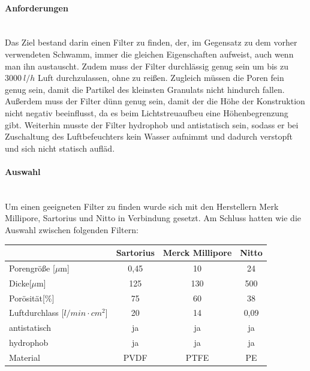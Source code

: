 \paragraph{Anforderungen}
\hfill \\
Das Ziel bestand darin einen Filter zu finden, der, im Gegensatz zu dem vorher verwendeten Schwamm, immer die gleichen Eigenschaften aufweist, auch wenn man ihn austauscht. Zudem muss der Filter durchlässig genug sein um bis zu $\SI{3000}{l/h}$ Luft durchzulassen, ohne zu reißen. Zugleich müssen die Poren fein genug sein, damit die Partikel des kleinsten Granulats nicht hindurch fallen. Außerdem muss der Filter dünn genug sein, damit der die Höhe der Konstruktion nicht negativ beeinflusst, da es beim Lichtstreuaufbeu eine Höhenbegrenzung gibt. Weiterhin musste der Filter hydrophob und antistatisch sein, sodass er bei Zuschaltung des Luftbefeuchters kein Wasser aufnimmt und dadurch verstopft und sich nicht statisch aufläd.


\paragraph{Auswahl}
\hfill \\
Um einen geeigneten Filter zu finden wurde sich mit den Herstellern Merk Millipore, Sartorius und Nitto in Verbindung gesetzt. Am Schluss hatten wie die Auswahl zwischen folgenden Filtern:


\begin{center}
			\begin{tabular}{l|c|c|c}
				& Sartorius & Merck Millipore & Nitto \\
				\hline
				Porengröße [$\mu$m] & 0,45  & 10    & 24 \\
				Dicke[$\mu$m] & 125 & 130 & 500 \\
				Porösität[$\%$] & 75    & 60    & 38 \\
				Luftdurchlass [$l/min \cdot cm^2$] & 20    & 14    & 0,09 \\
				antistatisch & ja    & ja    & ja \\
				hydrophob & ja    & ja    & ja \\
				Material & PVDF\footnotemark[1]  & PTFE\footnotemark[2]  & PE\footnotemark[3] \\
			\end{tabular}	
\end{center}



